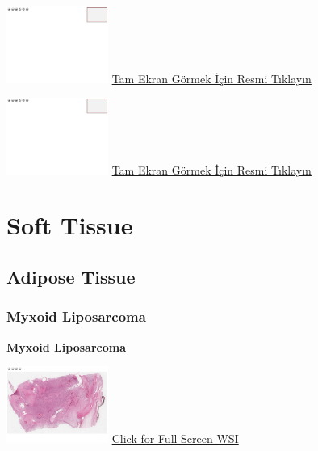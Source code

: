 \documentclass[
  letterpaper,
  paper=6in:9in,
  pagesize=pdftex,
  headinclude=on,
  footinclude=on,
  12pt]{scrbook}
\begin{document}
\href{https://images.patolojiatlasi.com/template/HE.html}{\includegraphics[width=0.25\textwidth,height=\textheight]{./screenshots/template_screenshot.png}}
\href{https://images.patolojiatlasi.com/exostosis/oc001.html}{Tam Ekran
Görmek İçin Resmi Tıklayın}

\href{https://images.patolojiatlasi.com/template/HE.html}{\includegraphics[width=0.25\textwidth,height=\textheight]{./screenshots/template_screenshot.png}}
\href{https://images.patolojiatlasi.com/exostosis/oc002.html}{Tam Ekran
Görmek İçin Resmi Tıklayın}

\part{Soft Tissue}

\hypertarget{sec-adipose-tissue}{%
\chapter{Adipose Tissue}\label{sec-adipose-tissue}}

\hypertarget{sec-myxoid-liposarcoma}{%
\section{Myxoid Liposarcoma}\label{sec-myxoid-liposarcoma}}

\textbf{Myxoid Liposarcoma}

\href{https://images.patolojiatlasi.com/myxoidliposarcoma/HE.html}{\includegraphics[width=0.25\textwidth,height=\textheight]{./screenshots/myxoidliposarcoma_screenshot.png}}
\href{https://images.patolojiatlasi.com/myxoidliposarcoma/HE.html}{Click
for Full Screen WSI}
\end{document}
